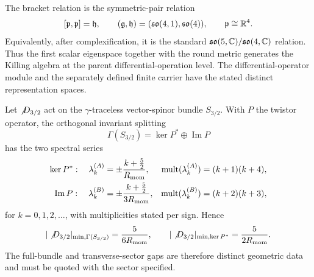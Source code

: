 \documentclass[11pt]{article}
\begin{document}
\begin{remark}
\label{p1:rem:symmetric-pair-bracket}
\leavevmode\par
The bracket relation is the symmetric-pair relation
\[
 [\mathfrak p,\mathfrak p]=\mathfrak h,\qquad
 (\mathfrak g,\mathfrak h)=(\mathfrak{so}(4,1),\mathfrak{so}(4)),\qquad
 \mathfrak p\cong\RR^4.
\]
Equivalently, after complexification, it is the standard
\(\mathfrak{so}(5,\CC)/\mathfrak{so}(4,\CC)\) relation.  Thus the
first scalar eigenspace together with the round metric generates the Killing
algebra at the parent differential-operation level. The differential-operator
module and the separately defined finite carrier have the stated distinct
representation spaces.
\end{remark}

\begin{theorem}
\label{p1:thm:rarita-schwinger-spectrum}
Let \(\slashed D_{3/2}\) act on the \(\gamma\)-traceless vector-spinor bundle
\(S_{3/2}\).  With \(P\) the twistor operator, the orthogonal invariant
splitting
\[
  \Gamma(S_{3/2})=\ker P^*\oplus\operatorname{Im}P
\]
has the two spectral series
\begin{align*}
  \ker P^*:\quad
  \lambda_k^{(A)}&=\pm\frac{k+\tfrac52}{\Rmom},
  &\operatorname{mult}(\lambda_k^{(A)})&=(k+1)(k+4),\\
  \operatorname{Im}P:\quad
  \lambda_k^{(B)}&=\pm\frac{k+\tfrac52}{3\Rmom},
  &\operatorname{mult}(\lambda_k^{(B)})&=(k+2)(k+3),
\end{align*}
for \(k=0,1,2,\ldots\), with multiplicities stated per sign.  Hence
\[
  |\slashed D_{3/2}|_{\min,\Gamma(S_{3/2})}=\frac{5}{6\Rmom},
  \qquad
  |\slashed D_{3/2}|_{\min,\ker P^*}=\frac{5}{2\Rmom}.
\]
The full-bundle and transverse-sector gaps are therefore distinct geometric
data and must be quoted with the sector specified.
\end{theorem}
\end{document}
